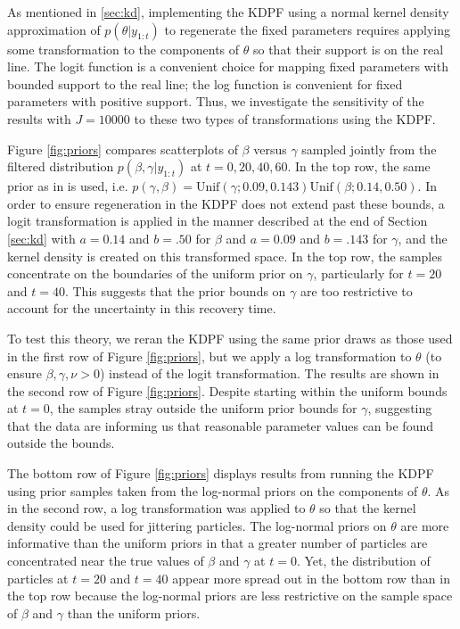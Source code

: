 \documentclass{elsarticle}
\begin{document}
As mentioned in \ref{sec:kd}, implementing the KDPF using a normal kernel density approximation of $p(\theta|y_{1:t})$ to regenerate the fixed parameters requires applying some transformation to the components of $\theta$ so that their support is on the real line. The logit function is a convenient choice for mapping fixed parameters with bounded support to the real line; the log function is convenient for fixed parameters with positive support. Thus, we investigate the sensitivity of the results with $J = 10000$ to these two types of transformations using the KDPF.

Figure \ref{fig:priors} compares scatterplots of $\beta$ versus $\gamma$ sampled jointly from the filtered distribution $p(\beta,\gamma|y_{1:t})$ at $t = 0, 20, 40, 60$. In the top row, the same prior as in \citet{skvortsov2012monitoring} is used, i.e. \hbox{$p(\gamma,\beta) = \mbox{Unif}(\gamma;0.09, 0.143) \mbox{Unif}(\beta; 0.14, 0.50)$}. In order to ensure regeneration in the KDPF does not extend past these bounds, a logit transformation is applied in the manner described at the end of Section \ref{sec:kd} with $a = 0.14$ and $b = .50$ for $\beta$ and $a = 0.09$ and $b = .143$ for $\gamma$, and the kernel density is created on this transformed space. In the top row, the samples concentrate on the boundaries of the uniform prior on $\gamma$, particularly for $t = 20$ and $t = 40$. This suggests that the prior bounds on $\gamma$ are too restrictive to account for the uncertainty in this recovery time.

To test this theory, we reran the KDPF using the same prior draws as those used in the first row of Figure \ref{fig:priors}, but we apply a log transformation to $\theta$ (to ensure $\beta,\gamma,\nu>0$) instead of the logit transformation. The results are shown in the second row of Figure \ref{fig:priors}. Despite starting within the uniform bounds at $t=0$, the samples stray outside the uniform prior bounds for $\gamma$, suggesting that the data are informing us that reasonable parameter values can be found outside the bounds.

The bottom row of Figure \ref{fig:priors} displays results from running the KDPF using prior samples taken from the log-normal priors on the components of $\theta$. As in the second row, a log transformation was applied to $\theta$ so that the kernel density could be used for jittering particles. The log-normal priors on $\theta$ are more informative than the uniform priors in that a greater number of particles are concentrated near the true values of $\beta$ and $\gamma$ at $t = 0$. Yet, the distribution of particles at $t = 20$ and $t = 40$ appear more spread out in the bottom row than in the top row because the log-normal priors are less restrictive on the sample space of $\beta$ and $\gamma$ than the uniform priors.
\end{document}
